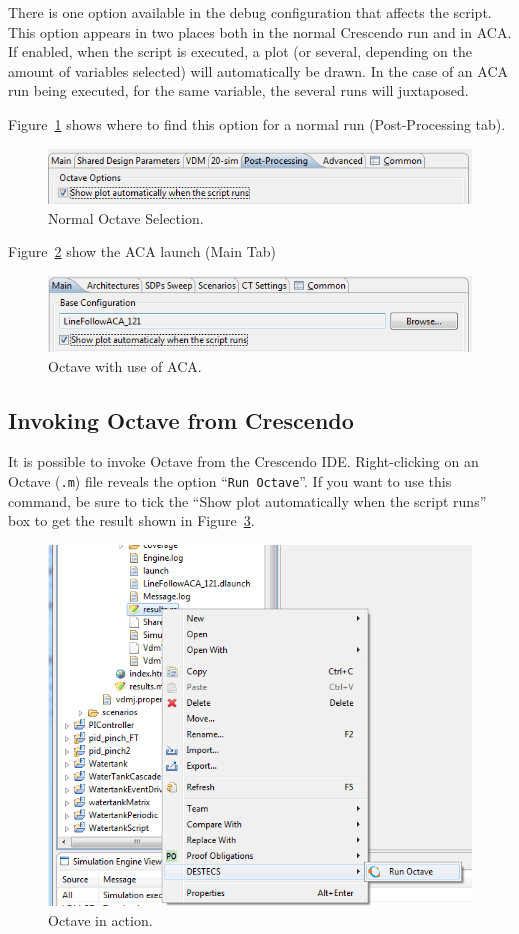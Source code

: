 \documentclass{crescendorepchap}
\begin{document}
There is one option available in the debug configuration that affects
the script. This option appears in two places both in the normal Crescendo
run and in ACA. If enabled, when the script is executed, a plot (or
several, depending on the amount of variables selected) will
automatically be drawn. In the case of an ACA run being executed, for
the same variable, the several runs will juxtaposed.

Figure~\ref{fig:octaveplotnormal} shows where to find this option for a normal run
(Post-Processing tab).

\begin{figure}[htbp]
\centering
\includegraphics[width=.6\textwidth]{images/TickOctaveplotNormal.png}
\caption{Normal Octave Selection.}
\label{fig:octaveplotnormal}
\end{figure}

Figure~\ref{fig:octaveplotaca} show the ACA launch (Main Tab)

\begin{figure}[htbp]
\centering
\includegraphics[width=.6\textwidth]{images/TickOctavePlotACA.png}
\caption{Octave with use of ACA.}
\label{fig:octaveplotaca}
\end{figure}

\subsection{Invoking Octave from Crescendo}

It is possible to invoke Octave from the Crescendo IDE. Right-clicking on
an Octave (\texttt{.m}) file reveals the option ``\texttt{Run Octave}''. If you want to
use this command, be sure to tick the ``Show plot automatically when the
script runs'' box to get the result shown in Figure~\ref{fig:octPlot}.

\begin{figure}[htbp]
\centering
\includegraphics[width=.6\textwidth]{images/OctaveAction.png}
\caption{Octave in action.\label{fig:octPlot}}
\end{figure}
\end{document}
